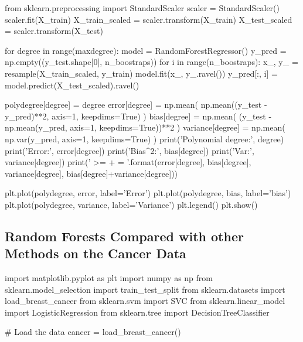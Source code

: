 \documentclass[%
oneside,                 %
final,                   %
10pt]{article}
\begin{document}
from sklearn.preprocessing import StandardScaler
scaler = StandardScaler()
scaler.fit(X_train)
X_train_scaled = scaler.transform(X_train)
X_test_scaled = scaler.transform(X_test)

for degree in range(maxdegree):
    model = RandomForestRegressor()
    y_pred = np.empty((y_test.shape[0], n_boostraps))
    for i in range(n_boostraps):
        x_, y_ = resample(X_train_scaled, y_train)
        model.fit(x_, y_.ravel())
        y_pred[:, i] = model.predict(X_test_scaled).ravel()

    polydegree[degree] = degree
    error[degree] = np.mean( np.mean((y_test - y_pred)**2, axis=1, keepdims=True) )
    bias[degree] = np.mean( (y_test - np.mean(y_pred, axis=1, keepdims=True))**2 )
    variance[degree] = np.mean( np.var(y_pred, axis=1, keepdims=True) )
    print('Polynomial degree:', degree)
    print('Error:', error[degree])
    print('Bias^2:', bias[degree])
    print('Var:', variance[degree])
    print('{} >= {} + {} = {}'.format(error[degree], bias[degree], variance[degree], bias[degree]+variance[degree]))

plt.plot(polydegree, error, label='Error')
plt.plot(polydegree, bias, label='bias')
plt.plot(polydegree, variance, label='Variance')
plt.legend()
plt.show()



\epycod




\subsection{Random Forests Compared with other Methods on the Cancer Data}
\bpycod
import matplotlib.pyplot as plt
import numpy as np
from sklearn.model_selection import  train_test_split 
from sklearn.datasets import load_breast_cancer
from sklearn.svm import SVC
from sklearn.linear_model import LogisticRegression
from sklearn.tree import DecisionTreeClassifier

# Load the data
cancer = load_breast_cancer()
\end{document}
